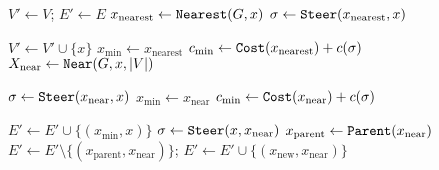 \documentclass{article}
\newcommand{\NearNodes}{Near}
\begin{document}
\begin{algorithm}[t] \small
    $V' \leftarrow V$; $E' \leftarrow E$\;
    $x_\mathrm{nearest} \leftarrow {\tt Nearest} (G, x)$\; \label{rrtstar:extend_nearest_start}
    $\sigma \leftarrow {\tt Steer} (x_\mathrm{nearest}, x)$\; \label{rrtstar:extend_nearest_end}
    {
        $V' \leftarrow V' \cup \{x\}$\;
        $x_\mathrm{min} \leftarrow x_\mathrm{nearest}$\;
        $c_\mathrm{min} \leftarrow {\tt Cost}(x_\mathrm{nearest}) + c(\sigma)$\;    
        \label{rrtstar:connect_to_close_node_start}
        $X_\mathrm{near} \leftarrow {\tt \NearNodes} (G, x, \vert V \vert)$\; 
        {
                $\sigma \leftarrow {\tt Steer} (x_\mathrm{near},x)$\;
                {
                    $x_\mathrm{min} \leftarrow x_\mathrm{near}$\;
                    $c_\mathrm{min} \leftarrow {\tt Cost} (x_\mathrm{near}) + c(\sigma)$\;
                }
            
        }

        $E' \leftarrow E' \cup \{(x_\mathrm{min}, x)\}$\;
        \label{rrtstar:connect_to_close_node_end}
        { 
            $\sigma \leftarrow {\tt Steer}(x, x_\mathrm{near})$\;
            {
                $x_\mathrm{parent} \leftarrow {\tt Parent} (x_\mathrm{near})$\;
                $E' \leftarrow E' \setminus \{ (x_\mathrm{parent}, x_\mathrm{near})\}$;
                $E' \leftarrow E' \cup \{(x_\mathrm{new}, x_\mathrm{near}) \}$\;  
                \label{rrtstar:extend_back_to_tree_end}
            } 
        } 
    }
    \caption{${\tt Extend}_{RRT^*} ((V,E),x)$}
    \label{algorithm:rrtstar_extend}
\end{algorithm}
\end{document}

